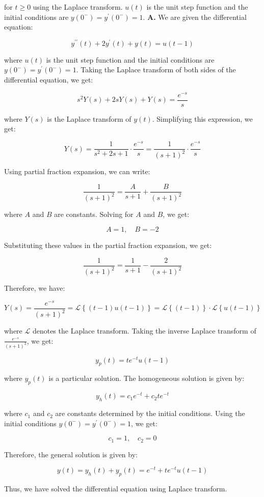 \documentclass[main.tex]{subfiles}
\begin{document}
\begin{enumerate}
    for $t \geq 0$ using the Laplace transform. $u(t)$ is the unit step function and the initial conditions are $y\left(0^{-}\right)=y^{\prime}\left(0^{-}\right)=1$. \textbf{A.} We are given the differential equation:
    
    $$
    y^{\prime \prime}(t)+2 y^{\prime}(t)+y(t)=u(t-1)
    $$
    
    where $u(t)$ is the unit step function and the initial conditions are $y\left(0^{-}\right)=y^{\prime}\left(0^{-}\right)=1$. Taking the Laplace transform of both sides of the differential equation, we get:
    
    $$
    s^{2} Y(s)+2 s Y(s)+Y(s)=\frac{e^{-s}}{s}
    $$
    
    where $Y(s)$ is the Laplace transform of $y(t)$. Simplifying this expression, we get:
    
    $$
    Y(s)=\frac{1}{s^{2}+2 s+1} \cdot \frac{e^{-s}}{s}=\frac{1}{(s+1)^{2}} \cdot \frac{e^{-s}}{s}
    $$
    
    Using partial fraction expansion, we can write:
    
    $$
    \frac{1}{(s+1)^{2}}=\frac{A}{s+1}+\frac{B}{(s+1)^{2}}
    $$
    
    where $A$ and $B$ are constants. Solving for $A$ and $B$, we get:
    
    $$
    A=1, \quad B=-2
    $$
    
    Substituting these values in the partial fraction expansion, we get:
    
    $$
    \frac{1}{(s+1)^{2}}=\frac{1}{s+1}-\frac{2}{(s+1)^{2}}
    $$
    
    Therefore, we have:
    
    $$
    Y(s)=\frac{e^{-s}}{(s+1)^{2}}=\mathcal{L}\left\{\left(t-1\right) u(t-1)\right\}=\mathcal{L}\left\{\left(t-1\right)\right\} \cdot \mathcal{L}\left\{u(t-1)\right\}
    $$
    
    where $\mathcal{L}$ denotes the Laplace transform. Taking the inverse Laplace transform of $\frac{e^{-s}}{(s+1)^{2}}$, we get:
    
    $$
    y_{p}(t)=t e^{-t} u(t-1)
    $$
    
    where $y_{p}(t)$ is a particular solution. The homogeneous solution is given by:
    
    $$
    y_{h}(t)=c_{1} e^{-t}+c_{2} t e^{-t}
    $$
    
    where $c_{1}$ and $c_{2}$ are constants determined by the initial conditions. Using the initial conditions $y\left(0^{-}\right)=y^{\prime}\left(0^{-}\right)=1$, we get:
    
    $$
    c_{1}=1, \quad c_{2}=0
    $$
    
    Therefore, the general solution is given by:
    
    $$
    y(t)=y_{h}(t)+y_{p}(t)=e^{-t}+t e^{-t} u(t-1)
    $$
    
    Thus, we have solved the differential equation using Laplace transform.

\end{enumerate}
\end{document}
